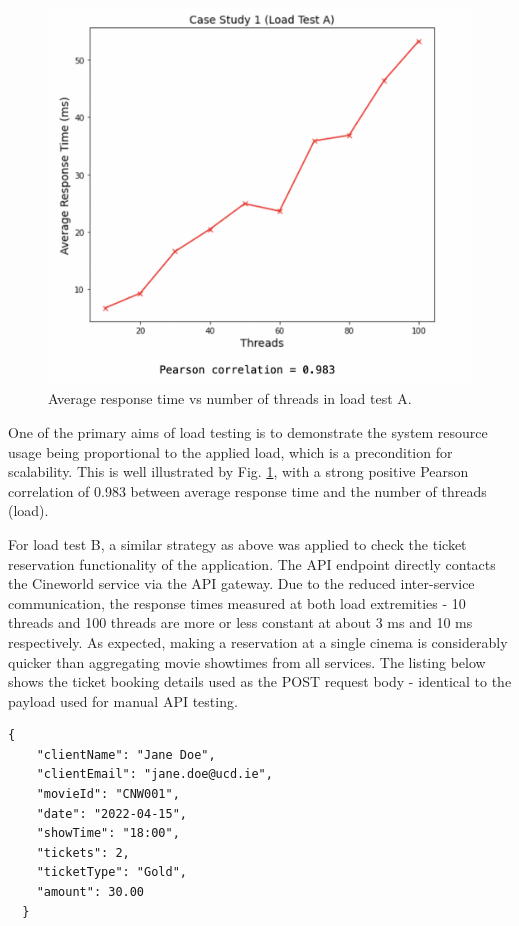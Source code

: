 \begin{figure}[H]
  \centering
  \includegraphics[width=0.55\linewidth]{./assets/images/case-studies/cs01-lta-4.png}
  \caption{Average response time vs number of threads in load test A.}
  \label{fig:cs01-lta-4}
\end{figure}

One of the primary aims of load testing is to demonstrate the system resource usage being proportional to the applied load, which is a precondition for scalability. This is well illustrated by Fig. \ref{fig:cs01-lta-4}, with a strong positive Pearson correlation of 0.983 between average response time and the number of threads (load).

For load test B, a similar strategy as above was applied to check the ticket reservation functionality of the application. The API endpoint  directly contacts the Cineworld service via the API gateway. Due to the reduced inter-service communication, the response times measured at both load extremities - 10 threads and 100 threads are more or less constant at about 3 ms and 10 ms respectively. As expected, making a reservation at a single cinema is considerably quicker than aggregating movie showtimes from all services. The listing below shows the ticket booking details used as the POST request body - identical to the payload used for manual API testing.

\begin{lstlisting}[caption=Dummy payload for load test B POST request]
  {
    "clientName": "Jane Doe",
    "clientEmail": "jane.doe@ucd.ie",
    "movieId": "CNW001",
    "date": "2022-04-15",
    "showTime": "18:00",
    "tickets": 2,
    "ticketType": "Gold",
    "amount": 30.00
  }
\end{lstlisting}



